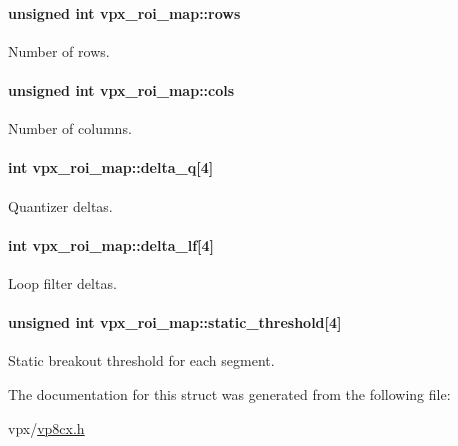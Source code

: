 \paragraph[{\texorpdfstring{rows}{rows}}]{\setlength{\rightskip}{0pt plus 5cm}unsigned int vpx\+\_\+roi\+\_\+map\+::rows}\hypertarget{structvpx__roi__map_a3fdcecd472553d08a99ced02cda5c9a6}{}\label{structvpx__roi__map_a3fdcecd472553d08a99ced02cda5c9a6}
Number of rows. 
\paragraph[{\texorpdfstring{cols}{cols}}]{\setlength{\rightskip}{0pt plus 5cm}unsigned int vpx\+\_\+roi\+\_\+map\+::cols}\hypertarget{structvpx__roi__map_a5458459aaf16b14b86fb0adef32757c8}{}\label{structvpx__roi__map_a5458459aaf16b14b86fb0adef32757c8}
Number of columns. 
\paragraph[{\texorpdfstring{delta\+\_\+q}{delta_q}}]{\setlength{\rightskip}{0pt plus 5cm}int vpx\+\_\+roi\+\_\+map\+::delta\+\_\+q\mbox{[}4\mbox{]}}\hypertarget{structvpx__roi__map_a6e7aecf1d31c329f43dcb36717b3999b}{}\label{structvpx__roi__map_a6e7aecf1d31c329f43dcb36717b3999b}
Quantizer deltas. 
\paragraph[{\texorpdfstring{delta\+\_\+lf}{delta_lf}}]{\setlength{\rightskip}{0pt plus 5cm}int vpx\+\_\+roi\+\_\+map\+::delta\+\_\+lf\mbox{[}4\mbox{]}}\hypertarget{structvpx__roi__map_a5164be48a612bf872b81e0a86726fbed}{}\label{structvpx__roi__map_a5164be48a612bf872b81e0a86726fbed}
Loop filter deltas. 
\paragraph[{\texorpdfstring{static\+\_\+threshold}{static_threshold}}]{\setlength{\rightskip}{0pt plus 5cm}unsigned int vpx\+\_\+roi\+\_\+map\+::static\+\_\+threshold\mbox{[}4\mbox{]}}\hypertarget{structvpx__roi__map_a3354ff458e229361b53a0b2d1bf68cfb}{}\label{structvpx__roi__map_a3354ff458e229361b53a0b2d1bf68cfb}
Static breakout threshold for each segment. 

The documentation for this struct was generated from the following file\+:\begin{DoxyCompactItemize}
\item 
vpx/\hyperlink{vp8cx_8h}{vp8cx.\+h}\end{DoxyCompactItemize}
